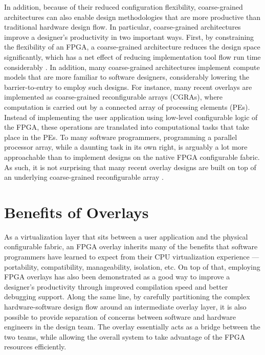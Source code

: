 In addition, because of their reduced configuration flexibility, coarse-grained architectures can also enable design methodologies that are more productive than traditional hardware design flow.
In particular, coarse-grained architectures improve a designer's productivity in two important ways.
First, by constraining the flexibility of an FPGA, a coarse-grained architecture reduces the design space significantly, which has a net effect of reducing implementation tool flow run time considerably \cite{lavin2011}. 
In addition, many coarse-grained architectures implement compute models that are more familiar to software designers, considerably lowering the barrier-to-entry to employ such designs.  For instance, many recent overlays are implemented as coarse-grained reconfigurable arrays (CGRAs), where computation is carried out by a connected array of processing elements (PEs).
Instead of implementing the user application using low-level configurable logic of the FPGA, these operations are translated into computational tasks that take place in the PEs.
To many software programmers, programming a parallel processor array, while a daunting task in its own right, is arguably a lot more approachable than to implement designs on the native FPGA configurable fabric.
As such, it is not surprising that many recent overlay designs are built on top of an underlying coarse-grained reconfigurable array \cite{kissler2006dynamically,ferreira2011fpga,shukla2006quku,Lin:2012:EDC:2460216.2460227,capalijia2013pipelined,dspoverlay}.





\section{Benefits of Overlays}
As a virtualization layer that sits between a user application and the physical configurable fabric, an FPGA overlay inherits many of the benefits that software programmers have learned to expect from their CPU virtualization experience --- portability, compatibility, manageability, isolation, etc.  On top of that, employing FPGA overlays has also been demonstrated as a good way to improve a designer's productivity through improved compilation speed and better debugging support.  Along the same line, by carefully partitioning the complex hardware-software design flow around an intermediate overlay layer, it is also possible to provide separation of concerns between software and hardware engineers in the design team.
The overlay essentially acts as a bridge between the two teams, while allowing the overall system to take advantage of the FPGA resources efficiently.

